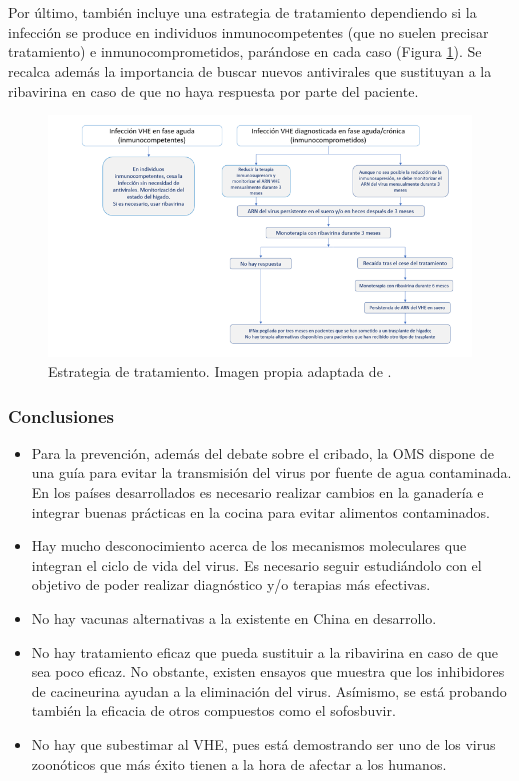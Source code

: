 \documentclass[11 pt]{article}
\begin{document}
\\\\Por último, también incluye una estrategia de tratamiento dependiendo si la infección se produce en individuos inmunocompetentes (que no suelen precisar tratamiento) e inmunocomprometidos, parándose en cada caso (Figura \ref{kamartrata}). Se recalca además la importancia de buscar nuevos antivirales que sustituyan a la ribavirina en caso de que no haya respuesta por parte del paciente.
\begin{figure} [h!] 
	\centering
	\includegraphics[width=\linewidth]{imagenes/tratamiento.png}
	\caption[loftitle]{Estrategia de tratamiento. Imagen propia adaptada de  \cite{Kamar2017}.}
	\label{kamartrata}
\end{figure}
\subsubsection{Conclusiones} 
\begin{itemize}
\item Para la prevención, además del debate sobre el cribado, la OMS dispone de una guía para evitar la transmisión del virus por fuente de agua contaminada. En los países desarrollados es necesario realizar cambios en la ganadería e integrar buenas prácticas en la cocina para evitar alimentos contaminados.
\item Hay mucho desconocimiento acerca de los mecanismos moleculares que integran el ciclo de vida del virus. Es necesario seguir estudiándolo con el objetivo de poder realizar diagnóstico y/o terapias más efectivas.
\item No hay vacunas alternativas a la existente en China en desarrollo.
\item No hay tratamiento eficaz que pueda sustituir a la ribavirina en caso de que sea poco eficaz. No obstante, existen ensayos que muestra que los inhibidores de cacineurina ayudan a la eliminación del virus. Asímismo, se está probando también la eficacia de otros compuestos como el sofosbuvir.
\item No hay que subestimar al VHE, pues está demostrando ser uno de los virus zoonóticos que más éxito tienen a la hora de afectar a los humanos. 
\end{itemize}
\end{document}
